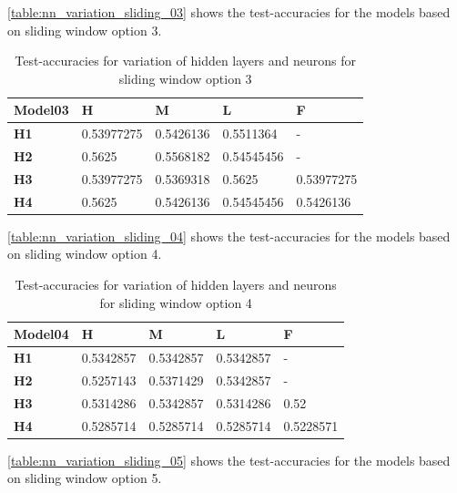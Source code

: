 \autoref{table:nn_variation_sliding_03} shows the test-accuracies for the models based on sliding window option 3.

\begin{table}
\centering
\begin{tabular}{|l|l|l|l|l|}
\hline

\textbf{Model03} & \textbf{H} & \textbf{M} & \textbf{L} & \textbf{F} \\ \hline
\textbf{H1} & 0.53977275 & 0.5426136 & 0.5511364 & - \\ \hline
\textbf{H2} & 0.5625 & 0.5568182 & 0.54545456 & - \\ \hline
\textbf{H3} & 0.53977275 & 0.5369318 & 0.5625 & 0.53977275 \\ \hline
\textbf{H4} & 0.5625 & 0.5426136 & 0.54545456 & 0.5426136 \\ \hline

\end{tabular}
\caption{Test-accuracies for variation of hidden layers and neurons for sliding window option 3}
\label{table:nn_variation_sliding_03}
\end{table}

\autoref{table:nn_variation_sliding_04} shows the test-accuracies for the models based on sliding window option 4.

\begin{table}
\centering
\begin{tabular}{|l|l|l|l|l|}
\hline

\textbf{Model04} & \textbf{H} & \textbf{M} & \textbf{L} & \textbf{F} \\ \hline
\textbf{H1} & 0.5342857 & 0.5342857 & 0.5342857 & - \\ \hline
\textbf{H2} & 0.5257143 & 0.5371429 & 0.5342857 & - \\ \hline
\textbf{H3} & 0.5314286 & 0.5342857 & 0.5314286 & 0.52 \\ \hline
\textbf{H4} & 0.5285714 & 0.5285714 & 0.5285714 & 0.5228571 \\ \hline

\end{tabular}
\caption{Test-accuracies for variation of hidden layers and neurons for sliding window option 4}
\label{table:nn_variation_sliding_04}
\end{table}

\autoref{table:nn_variation_sliding_05} shows the test-accuracies for the models based on sliding window option 5.

